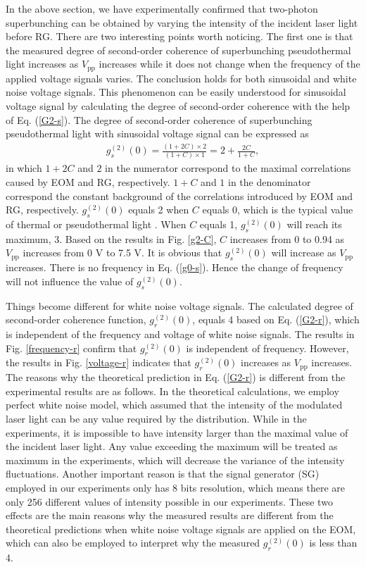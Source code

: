 \documentclass[12pt]{iopart}
\begin{document}
In the above section, we have experimentally confirmed that two-photon superbunching can be obtained by varying the intensity of the incident laser light before RG. There are two interesting points worth noticing. The first one is that the measured degree of second-order coherence of superbunching pseudothermal light increases as $V_{\text{pp}}$ increases while it does not change when the frequency of the applied voltage signals varies. The conclusion holds for both sinusoidal and white noise voltage signals. This phenomenon can be easily understood for sinusoidal voltage signal by calculating the degree of second-order coherence with the help of Eq. (\ref{G2-s}). The degree of second-order coherence of superbunching pseudothermal light with sinusoidal voltage signal can be expressed as
\begin{eqnarray}\label{g0-s}
g^{(2)}_s(0)=\frac{(1+2C)\times 2}{(1+C)\times 1}=2+\frac{2C}{1+C},
\end{eqnarray}
in which $1+2C$ and $2$ in the numerator correspond to the maximal correlations caused by EOM and RG, respectively. $1+C$ and $1$ in the denominator correspond the constant background of the correlations introduced by EOM and RG, respectively. $g^{(2)}_s(0)$ equals 2 when $C$ equals 0, which is the typical value of thermal or pseudothermal light \cite{martienssen}. When  $C$ equals 1, $g^{(2)}_s(0)$ will reach its maximum, 3. Based on the results in Fig. \ref{g2-C}, $C$ increases from 0 to 0.94 as $V_{\text{pp}}$  increases from 0 V to 7.5 V. It is obvious that $g^{(2)}_s(0)$ will increase as $V_{\text{pp}}$ increases. There is no frequency in Eq. (\ref{g0-s}). Hence the change of frequency will not influence the value of $g^{(2)}_s(0)$.

Things become different for white noise voltage signals. The calculated degree of second-order coherence function, $g^{(2)}_r(0)$, equals 4 based on Eq. (\ref{G2-r}), which is independent of the frequency and voltage of white noise signals. The results in Fig. \ref{frequency-r} confirm that $g^{(2)}_r(0)$ is independent of frequency. However, the results in Fig. \ref{voltage-r} indicates that $g^{(2)}_r(0)$ increases as $V_{\text{pp}}$ increases. The reasons why the theoretical prediction in Eq. (\ref{G2-r}) is different from the experimental results are as follows. In the theoretical calculations, we employ perfect white noise model, which assumed that the intensity of the modulated laser light can be any value required by the distribution. While in the experiments, it is impossible to have intensity larger than the maximal value of the incident laser light. Any value exceeding the maximum will be treated as maximum in the experiments, which will decrease the variance of the intensity fluctuations. Another important reason is that the signal generator (SG) employed in our experiments only has 8 bits resolution, which means there are only 256 different values of intensity possible in our experiments. These two effects are the main reasons why the measured results are different from the theoretical predictions when white noise voltage signals are applied on the EOM, which can also be employed to interpret why the measured $g^{(2)}_r(0)$ is less than 4.
\end{document}
